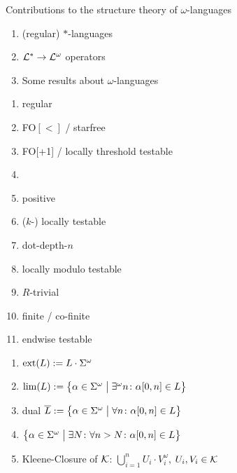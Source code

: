 \documentclass[a4,notes]{seminar}
\begin{document}
\begin{slide}
\center\huge Contributions to the structure theory of $ω$-languages
\end{slide}

\begin{slide}
\begin{enumerate}
\item (regular) $*$-languages
\item $\Lang^* \rightarrow \Lang^\omega$ operators
\item Some results about $\omega$-languages
\end{enumerate}
\end{slide}

\begin{slide}
\begin{enumerate}
\item regular
\item FO$[<]$ / starfree
\item FO[+1] / locally threshold testable
\item \PT
\item positive \PT
\item ($k$-) locally testable
\item dot-depth-$n$
\item locally modulo testable
\item $R$-trivial
\item finite / co-finite
\item endwise testable
\end{enumerate}
\end{slide}

\begin{slide}
\center{\bf $\Lang^* \rightarrow \Lang^\omega$}
\begin{enumerate}
\item $\operatorname{ext}(L) := L \cdot \Sigma^\omega$
\item $\lim(L) := \Set{ \alpha \in \Sigma^\omega }{ \exists^\omega n \colon \alpha[0,n] \in L }$
\item dual $\overline{L} := \Set{ \alpha \in \Sigma^\omega }{ \forall n \colon \alpha[0,n] \in L }$
\item $\Set{ \alpha \in \Sigma^\omega }{ \exists N \colon \forall n > N \colon \alpha[0,n] \in L }$
\item Kleene-Closure of $\mathcal{K}$: $\bigcup_{i=1}^n U_i \cdot V_i^\omega$, $U_i, V_i \in \mathcal{K}$
\end{enumerate}
\end{slide}
\end{document}
